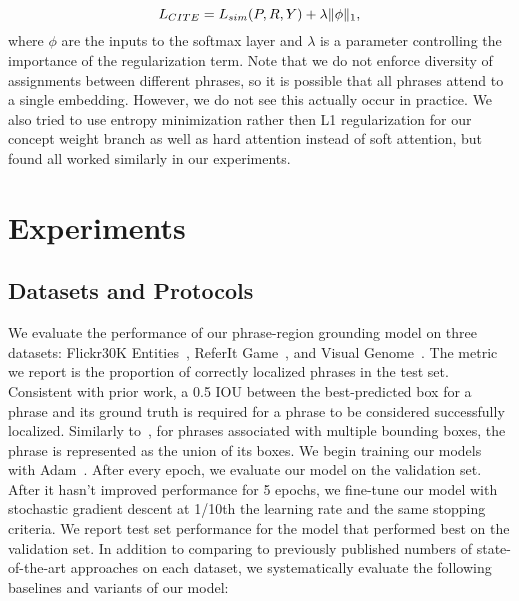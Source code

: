 \documentclass[runningheads]{llncs}
\DeclarePairedDelimiter{\norm}{\lVert}{\rVert}
\begin{document}
\begin{equation}
L_{CITE} = L_{sim}(P,R,Y) + \lambda\norm{\phi}_1,
\label{eq:final_loss}
\end{equation}\noindent where $\phi$ are the inputs to the softmax layer and $\lambda$ is a parameter controlling the importance of the regularization term.  Note that we do not enforce diversity of assignments between different phrases, so it is possible that all phrases attend to a single embedding.  However, we do not see this actually occur in practice.  We also tried to use entropy minimization rather then L1 regularization for our concept weight branch as well as hard attention instead of soft attention, but found all worked similarly in our experiments.


\section{Experiments}\label{sec:experiments}\subsection{Datasets and Protocols}

We evaluate the performance of our phrase-region grounding model on three datasets: Flickr30K Entities~\cite{flickrentitiesijcv}, ReferIt Game~\cite{kazemzadeh-EtAl:2014:EMNLP2014}, and Visual Genome~\cite{krishnavisualgenome}. The metric we report is the proportion of correctly localized phrases in the test set. Consistent with prior work, a 0.5 IOU between the best-predicted box for a phrase and its ground truth is required for a phrase to be considered successfully localized.    Similarly to~\cite{wangTwoBranch2017,plummerPLCLC2017,ChenICCV2017}, for phrases associated with multiple bounding boxes, the phrase is represented as the union of its boxes.
\smallskip{} We begin training our models with Adam~\cite{adam}.  After every epoch, we evaluate our model on the validation set. After it hasn't improved performance for 5 epochs, we fine-tune our model with stochastic gradient descent at 1/10th the learning rate and the same stopping criteria.  We report test set performance for the model that performed best on the validation set.
\smallskip{} In addition to comparing to previously published numbers of state-of-the-art approaches on each dataset, we systematically evaluate the following baselines and variants of our model:
\end{document}
